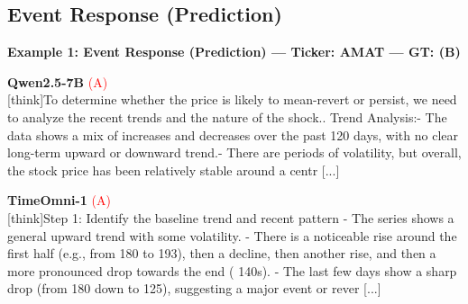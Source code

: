 \clearpage
\subsection{Event Response (Prediction)}


\noindent
\textbf{Example 1: Event Response (Prediction) --- Ticker: AMAT --- GT: (B)}
\vspace{2pt}

\noindent
\begin{minipage}[t]{0.28\textwidth}
\colorbox{red!8}{\parbox{\dimexpr\textwidth-2\fboxsep}{
\textbf{Qwen2.5-7B} \textcolor{red}{(A)} \\[2pt]
\tiny
[think]\newline To determine whether the price is likely to mean-revert or persist, we need to analyze the recent trends and the nature of the shock.. Trend Analysis:\newline    - The data shows a mix of increases and decreases over the past 120 days, with no clear long-term upward or downward trend.\newline    - There are periods of volatility, but overall, the stock price has been relatively stable around a centr [...]
}}
\end{minipage}
\hfill
\begin{minipage}[t]{0.28\textwidth}
\colorbox{red!8}{\parbox{\dimexpr\textwidth-2\fboxsep}{
\textbf{TimeOmni-1} \textcolor{red}{(A)} \\[2pt]
\tiny
[think]\newline Step 1: Identify the baseline trend and recent pattern  \newline - The series shows a general upward trend with some volatility.  \newline - There is a noticeable rise around the first half (e.g., from  180 to  193), then a decline, then another rise, and then a more pronounced drop towards the end ( 140s).  \newline - The last few days show a sharp drop (from  180 down to  125), suggesting a major event or rever [...]
}}
\end{minipage}
\hfill
